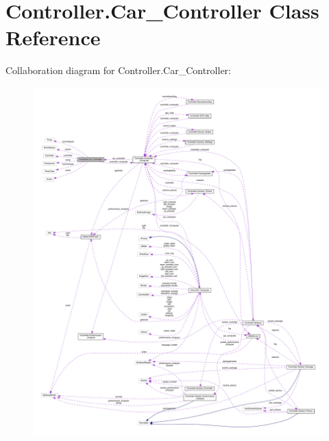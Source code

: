 \hypertarget{class_controller_1_1_car___controller}{}\section{Controller.\+Car\+\_\+\+Controller Class Reference}
\label{class_controller_1_1_car___controller}


Collaboration diagram for Controller.\+Car\+\_\+\+Controller\+:
\nopagebreak
\begin{figure}[H]
\begin{center}
\leavevmode
\includegraphics[width=350pt]{class_controller_1_1_car___controller__coll__graph}
\end{center}
\end{figure}
